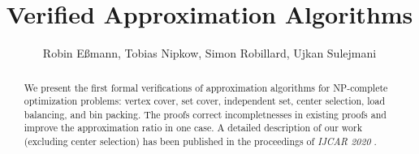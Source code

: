 \documentclass[11pt,a4paper]{article}
\begin{document}
\title{Verified Approximation Algorithms}
\author{Robin E{\ss}mann, Tobias Nipkow, Simon Robillard, Ujkan Sulejmani}
\maketitle

\begin{abstract}
We present the first formal verifications of approximation algorithms
for NP-complete optimization problems:
vertex cover, set cover, independent set, center selection, load balancing, and bin packing.
The proofs correct incompletnesses in existing proofs
and improve the approximation ratio in one case.
A detailed description of our work (excluding center selection) has been published in the proceedings of
\emph{IJCAR 2020} \cite{EssmannNR-IJCAR20}.
\end{abstract}

\tableofcontents





\end{document}
